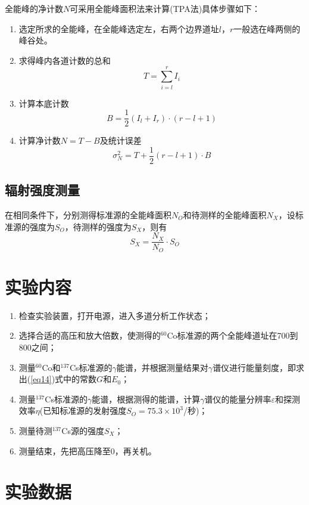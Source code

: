 \documentclass[a4paper]{article}
\begin{document}
全能峰的净计数$N$可采用全能峰面积法来计算(TPA法)具体步骤如下：
\begin{enumerate}
\item 选定所求的全能峰，在全能峰选定左，右两个边界道址$l$，$r$一般选在峰两侧的峰谷处。
\item 求得峰内各道计数的总和
\begin{equation}
T = \sum\limits_{i=l}^rI_i
\end{equation}
\item 计算本底计数
\begin{equation}
B = \frac12(I_l+I_r)\cdot(r-l+1)
\end{equation}
\item 计算净计数$N=T-B$及统计误差
\begin{equation}
\sigma_N^2 = T + \frac12(r-l+1)\cdot B
\end{equation}
\end{enumerate}

\subsection{辐射强度测量}
在相同条件下，分别测得标准源的全能峰面积$N_O$和待测样的全能峰面积$N_X$，设标准源的强度为$S_O$，待测样的强度为$S_X$，则有
\begin{equation}
S_X = \frac{N_X}{N_O}\cdot S_O\label{eq17}
\end{equation}

\section{实验内容}
\begin{enumerate}
\item 检查实验装置，打开电源，进入多道分析工作状态；
\item 选择合适的高压和放大倍数，使测得的$^{60}$Co标准源的两个全能峰道址在700到800之间；
\item 测量$^{60}$Co和$^{137}$Cs标准源的$\gamma$能谱，并根据测量结果对$\gamma$谱仪进行能量刻度，即求出(\ref{eq14})式中的常数$G$和$E_0$；
\item 测量$^{137}$Cs标准源的$\gamma$能谱，根据测得的能谱，计算$\gamma$谱仪的能量分辨率$\varepsilon$和探测效率$\eta$(已知标准源的发射强度$S_O = 75.3\times 10^3$/秒)；
\item 测量待测$^{137}$Cs源的强度$S_X$；
\item 测量结束，先把高压降至0，再关机。
\end{enumerate}

\section{实验数据}
\end{document}
